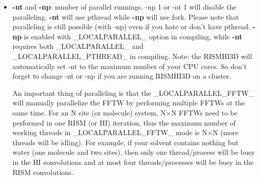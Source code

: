 \documentclass[aip,amsmath,amssymb,reprint,onecolumn]{revtex4-1}
\begin{document}
\begin{itemize}
    \item {\bf -nt} and {\bf -np}: number of parallel runnings. -np 1 or -nt 1 will disable the paralleling. {\bf -nt} will use pthread while {\bf -np} will use fork. Please note that paralleling is still possible (with -np) even if you hate or don't have pthread. {\bf -np} is enabled with \_LOCALPARALLEL\_ option in compiling, while {\bf -nt} requires both \_LOCALPARALLEL\_ and \_LOCALPARALLEL\_PTHREAD\_ in compiling. Note: the RISMHI3D will automatically set -nt to the maximum number of your CPU cores. So don't forget to change -nt or -np if you are running RISMHI3D on a cluster.

        An important thing of paralleling is that the \_LOCALPARALLEL\_FFTW\_ will manually parallelize the FFTW by performing multiple FFTWs at the same time. For an N site (or molecule) system, N$\times$N FFTWs need to be performed in one RISM (or HI) iteration, thus the maximum number of working threads in \_LOCALPARALLEL\_FFTW\_ mode is N$\times$N (more threads will be idling). For example, if your solvent contains nothing but water (one molecule and two sites), then only one thread/process will be busy in the HI convolutions and at most four threads/processes will be busy in the RISM convolutions.


\end{itemize}
\end{document}
